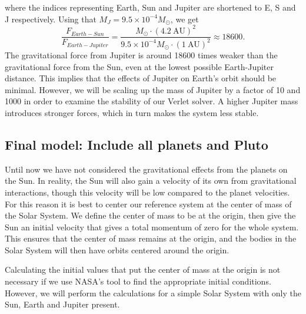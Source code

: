 \documentclass{emulateapj}
\begin{document}
%
where the indices representing Earth, Sun and Jupiter are shortened to E, S and J respectively.
Using that $M_{J} = 9.5 \times 10^{-4} M_\odot$, we get
%
\begin{equation*}
    \frac{F_{Earth-Sun}}{F_{Earth-Jupiter}} = \frac{M_\odot \cdot (4.2 \ \textrm{AU})^2}{9.5 \times 10^{-4} M_\odot \cdot (1 \ \textrm{AU})^2} \approx 18600.
\end{equation*}
%
The gravitational force from Jupiter is around 18600 times weaker than the gravitational force from the Sun, even at the lowest possible Earth-Jupiter distance. This implies that the effects of Jupiter on Earth's orbit should be minimal. However, we will be scaling up the mass of Jupiter by a factor of 10 and 1000 in order to examine the stability of our Verlet solver. A higher Jupiter mass introduces stronger forces, which in turn makes the system less stable.

\subsection{Final model: Include all planets and Pluto}

Until now we have not considered the gravitational effects from the planets on the Sun. In reality, the Sun will also gain a velocity of its own from gravitational interactions, though this velocity will be low compared to the planet velocities. For this reason it is best to center our reference system at the center of mass of the Solar System. We define the center of mass to be at the origin, then give the Sun an initial velocity that gives a total momentum of zero for the whole system. This ensures that the center of mass remains at the origin, and the bodies in the Solar System will then have orbits centered around the origin.

Calculating the initial values that put the center of mass at the origin is not necessary if we use NASA's tool \cite{bib:nasa} to find the appropriate initial conditions. However, we will perform the calculations for a simple Solar System with only the Sun, Earth and Jupiter present.
\end{document}
